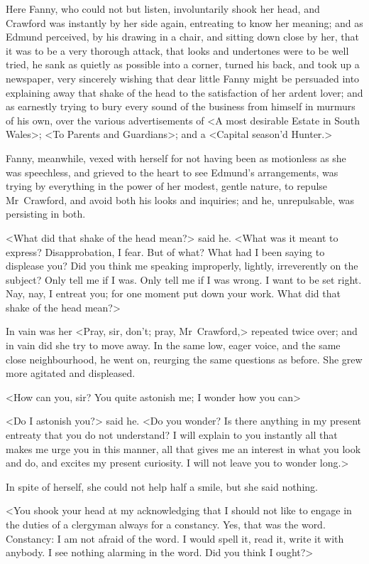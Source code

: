 Here Fanny, who could not but listen, involuntarily shook her head, and Crawford was instantly by her side again, entreating to know her meaning; and as Edmund perceived, by his drawing in a chair, and sitting down close by her, that it was to be a very thorough attack, that looks and undertones were to be well tried, he sank as quietly as possible into a corner, turned his back, and took up a newspaper, very sincerely wishing that dear little Fanny might be persuaded into explaining away that shake of the head to the satisfaction of her ardent lover; and as earnestly trying to bury every sound of the business from himself in murmurs of his own, over the various advertisements of <A most desirable Estate in South Wales>; <To Parents and Guardians>; and a <Capital season'd Hunter.>

Fanny, meanwhile, vexed with herself for not having been as motionless as she was speechless, and grieved to the heart to see Edmund's arrangements, was trying by everything in the power of her modest, gentle nature, to repulse Mr~Crawford, and avoid both his looks and inquiries; and he, unrepulsable, was persisting in both.

<What did that shake of the head mean?> said he. <What was it meant to express? Disapprobation, I fear. But of what? What had I been saying to displease you? Did you think me speaking improperly, lightly, irreverently on the subject? Only tell me if I was. Only tell me if I was wrong. I want to be set right. Nay, nay, I entreat you; for one moment put down your work. What did that shake of the head mean?>

In vain was her <Pray, sir, don't; pray, Mr~Crawford,> repeated twice over; and in vain did she try to move away. In the same low, eager voice, and the same close neighbourhood, he went on, reurging the same questions as before. She grew more agitated and displeased.

<How can you, sir? You quite astonish me; I wonder how you can\longdash>

<Do I astonish you?> said he. <Do you wonder? Is there anything in my present entreaty that you do not understand? I will explain to you instantly all that makes me urge you in this manner, all that gives me an interest in what you look and do, and excites my present curiosity. I will not leave you to wonder long.>

In spite of herself, she could not help half a smile, but she said nothing.

<You shook your head at my acknowledging that I should not like to engage in the duties of a clergyman always for a constancy. Yes, that was the word. Constancy: I am not afraid of the word. I would spell it, read it, write it with anybody. I see nothing alarming in the word. Did you think I ought?>

